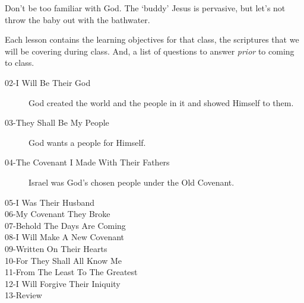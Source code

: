 \begin{discussion}


Don't be too familiar with God.  The `buddy' Jesus is pervasive, but let's not throw the baby out with the bathwater.





Each lesson contains the learning objectives for that class, the scriptures that we will be covering during class.  And, a list of questions to answer \emph{prior} to coming to class.

\begin{description}

\item[02-I Will Be Their God] God created the world and the people in it and showed Himself to them.

\item[03-They Shall Be My People] God wants a people for Himself.

\item[04-The Covenant I Made With Their Fathers] Israel was God's chosen people under the Old Covenant.

\item[05-I Was Their Husband] 

\item[06-My Covenant They Broke]

\item[07-Behold The Days Are Coming]

\item[08-I Will Make A New Covenant]

\item[09-Written On Their Hearts]

\item[10-For They Shall All Know Me]

\item[11-From The Least To The Greatest]

\item[12-I Will Forgive Their Iniquity]

\item[13-Review]


\end{description}



\end{discussion}
